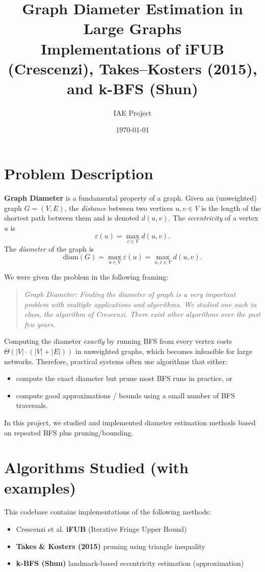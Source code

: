 \documentclass[11pt]{article}
\title{Graph Diameter Estimation in Large Graphs\\
\large Implementations of iFUB (Crescenzi), Takes--Kosters (2015), and k-BFS (Shun)}
\author{IAE Project}
\date{\today}
\begin{document}
\maketitle

\section{Problem Description}

\textbf{Graph Diameter} is a fundamental property of a graph. Given an (unweighted) graph $G=(V,E)$, the \emph{distance} between two vertices $u,v\in V$ is the length of the shortest path between them and is denoted $d(u,v)$. The \emph{eccentricity} of a vertex $u$ is
\[
\varepsilon(u) = \max_{v\in V} d(u,v).
\]
The \emph{diameter} of the graph is
\[
\mathrm{diam}(G)=\max_{u\in V} \varepsilon(u) = \max_{u,v\in V} d(u,v).
\]

We were given the problem in the following framing:

\begin{quote}
\emph{Graph Diameter: Finding the diameter of graph is a very important problem with multiple applications and algorithms. We studied one such in class, the algorithm of Crescenzi. There exist other algorithms over the past few years.}
\end{quote}

Computing the diameter \emph{exactly} by running BFS from every vertex costs $\Theta(|V|\cdot(|V|+|E|))$ in unweighted graphs, which becomes infeasible for large networks. Therefore, practical systems often use algorithms that either:
\begin{itemize}
  \item compute the exact diameter but prune most BFS runs in practice, or
  \item compute good approximations / bounds using a small number of BFS traversals.
\end{itemize}

In this project, we studied and implemented diameter estimation methods based on repeated BFS plus pruning/bounding.

\section{Algorithms Studied (with examples)}

This codebase contains implementations of the following methods:
\begin{itemize}
  \item Crescenzi et al. \textbf{iFUB} (Iterative Fringe Upper Bound)
  \item \textbf{Takes \& Kosters (2015)} pruning using triangle inequality
  \item \textbf{k-BFS (Shun)} landmark-based eccentricity estimation (approximation)
\end{itemize}
\end{document}

